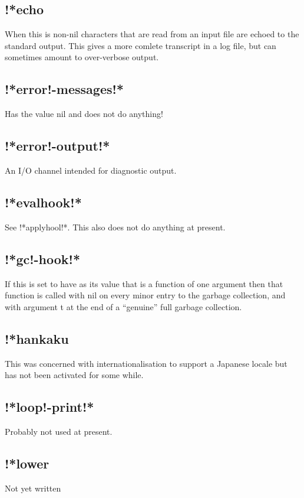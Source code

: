 \documentclass[a4paper,11pt]{article}
\begin{document}
\subsection{\ttfamily !*echo}
   When this is non-nil characters that are read from an input file are
   echoed to the standard output. This gives a more comlete transcript in
   a log file, but can sometimes amount to over-verbose output.

\subsection{\ttfamily !*error!-messages!*}
   Has the value nil and does not do anything!

\subsection{\ttfamily !*error!-output!*}
   An I/O channel intended for diagnostic output.

\subsection{\ttfamily !*evalhook!*}
   See {\ttfamily !*applyhool!*}. This also does not do anything at present.

\subsection{\ttfamily !*gc!-hook!*}
   If this is set to have as its value that is a function of one argument then
   that function is called with {\ttfamily nil} on every minor entry to the
   garbage collection, and with argument {\ttfamily t} at the end of a ``genuine''
   full garbage collection.

\subsection{\ttfamily !*hankaku}
   This was concerned with internationalisation to support a Japanese
   locale but has not been activated for some while.

\subsection{\ttfamily !*loop!-print!*}
   Probably not used at present.

\subsection{\ttfamily !*lower}
   Not yet written
\end{document}
